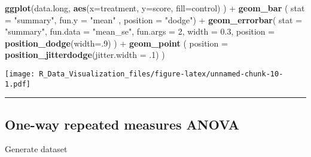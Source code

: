 \documentclass[]{article}
\newenvironment{Shaded}{\begin{snugshade}}{\end{snugshade}}
\newcommand{\KeywordTok}[1]{\textcolor[rgb]{0.13,0.29,0.53}{\textbf{{#1}}}}
\newcommand{\DataTypeTok}[1]{\textcolor[rgb]{0.13,0.29,0.53}{{#1}}}
\newcommand{\DecValTok}[1]{\textcolor[rgb]{0.00,0.00,0.81}{{#1}}}
\newcommand{\FloatTok}[1]{\textcolor[rgb]{0.00,0.00,0.81}{{#1}}}
\newcommand{\StringTok}[1]{\textcolor[rgb]{0.31,0.60,0.02}{{#1}}}
\newcommand{\NormalTok}[1]{{#1}}
\begin{document}
\begin{Shaded}
\begin{Highlighting}[]
\KeywordTok{ggplot}\NormalTok{(data.long, }\KeywordTok{aes}\NormalTok{(}\DataTypeTok{x=}\NormalTok{treatment, }\DataTypeTok{y=}\NormalTok{score, }\DataTypeTok{fill=}\NormalTok{control) ) +}\StringTok{ }
\StringTok{  }\KeywordTok{geom_bar}     \NormalTok{( }\DataTypeTok{stat =} \StringTok{"summary"}\NormalTok{, }\DataTypeTok{fun.y    =} \StringTok{"mean"} \NormalTok{, }\DataTypeTok{position =} \StringTok{"dodge"}\NormalTok{) +}\StringTok{ }
\StringTok{  }\KeywordTok{geom_errorbar}\NormalTok{( }\DataTypeTok{stat =} \StringTok{"summary"}\NormalTok{, }\DataTypeTok{fun.data =} \StringTok{"mean_se"}\NormalTok{, }\DataTypeTok{fun.args =} \DecValTok{2}\NormalTok{, }\DataTypeTok{width =} \FloatTok{0.3}\NormalTok{, }
                 \DataTypeTok{position =} \KeywordTok{position_dodge}\NormalTok{(}\DataTypeTok{width=}\NormalTok{.}\DecValTok{9}\NormalTok{) ) +}\StringTok{ }
\StringTok{  }\KeywordTok{geom_point}  \NormalTok{( }\DataTypeTok{position =} \KeywordTok{position_jitterdodge}\NormalTok{(}\DataTypeTok{jitter.width =} \NormalTok{.}\DecValTok{1}\NormalTok{) )}
\end{Highlighting}
\end{Shaded}

\texttt{[image: R\_Data\_Visualization\_files/figure-latex/unnamed-chunk-10-1.pdf]}

\begin{center}\rule{0.5\linewidth}{\linethickness}\end{center}

\newpage  

\subsection{One-way repeated measures
ANOVA}\label{one-way-repeated-measures-anova}

Generate dataset
\end{document}

